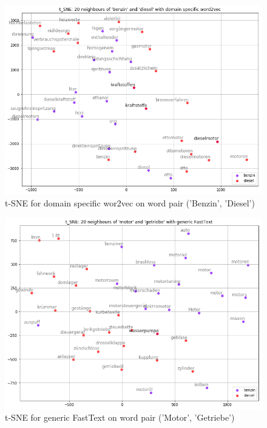 \documentclass[10pt,a4paper]{article}
\begin{document}
\begin{figure}
\begin{center}
	\includegraphics[scale=0.4]{./Pictures/model_ds_w2v_benzin_diesel.png}
	\caption{t-SNE for domain specific wor2vec on word pair ('Benzin', 'Diesel')}
\end{center}	
\end{figure}

\begin{figure}
	\begin{center}
		\includegraphics[scale=0.4]{./Pictures/model_ft_motor_getriebe.png}
		
		\caption{t-SNE for generic FastText on word pair ('Motor', 'Getriebe')}
	\end{center}
\end{figure}
\end{document}
